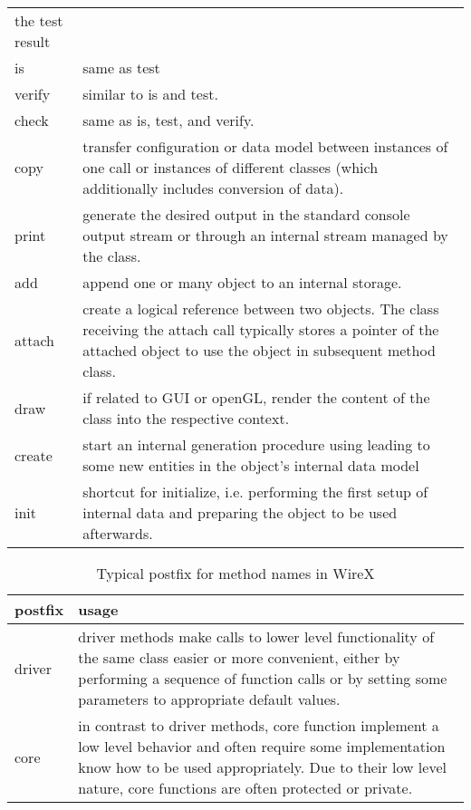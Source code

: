 \documentclass[11pt,a4paper,onepage,openany]{book}
\begin{document}
\begin{table}[tbp]
\begin{tabular}{p{}p{}}
  the test result\\
  is & same as test\\
  verify & similar to is and test.\\
  check & same as is, test, and verify.\\
  copy & transfer configuration or data model between instances of one call or
  instances of different classes (which additionally includes conversion of
  data).\\
  print & generate the desired output in the standard console output stream or
  through an internal stream managed by the class.\\
  add & append one or many object to an internal storage. \\
  attach & create a logical reference between two objects. The class receiving
  the attach call typically stores a pointer of the attached object to use the
  object in subsequent method class.\\
  draw & if related to GUI or openGL, render the content of the class into the
  respective context.\\
  create & start an internal generation procedure using leading to some new
  entities in the object's internal data model\\
  init & shortcut for initialize, i.e. performing the first setup of internal
  data and preparing the object to be used afterwards.\\
  \hline
\end{tabular}
\end{table}

\begin{table}[tbp]
\centering
\caption{Typical postfix for method names in WireX}\label{tab:PostfixWords}
\begin{tabular}{p{}p{}}
\hline
  postfix & usage \\
  \hline
  driver & driver methods make calls to lower level functionality of the same
  class easier or more convenient, either by performing a sequence of function
  calls or by setting some parameters to appropriate default values.\\
  core & in contrast to driver methods, core function implement a low level
  behavior and often require some implementation know how to be used
  appropriately. Due to their low level nature, core functions are often
  protected or private.\\
  \hline
\end{tabular}
\end{table}
\end{document}
